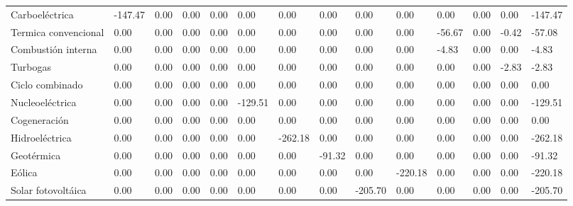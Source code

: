 \documentclass{sener2025}
\begin{document}
\begin{tabladoradoLargo}
\begin{xltabular}{\textwidth}{QZZZZZZZZZZZZZ}
    \hspace{2.7em} Carboeléctrica & -147.47 & 0.00 & 0.00 & 0.00 & 0.00 & 0.00 & 0.00 & 0.00 & 0.00 & 0.00 & 0.00 & 0.00 & -147.47 \\
    \hspace{2.7em} Termica convencional & 0.00 & 0.00 & 0.00 & 0.00 & 0.00 & 0.00 & 0.00 & 0.00 & 0.00 & -56.67 & 0.00 & -0.42 & -57.08 \\
    \hspace{2.7em} Combustión interna & 0.00 & 0.00 & 0.00 & 0.00 & 0.00 & 0.00 & 0.00 & 0.00 & 0.00 & -4.83 & 0.00 & 0.00 & -4.83 \\
    \hspace{2.7em} Turbogas & 0.00 & 0.00 & 0.00 & 0.00 & 0.00 & 0.00 & 0.00 & 0.00 & 0.00 & 0.00 & 0.00 & -2.83 & -2.83 \\
    \hspace{2.7em} Ciclo combinado & 0.00 & 0.00 & 0.00 & 0.00 & 0.00 & 0.00 & 0.00 & 0.00 & 0.00 & 0.00 & 0.00 & 0.00 & 0.00 \\
    \hspace{2.7em} Nucleoeléctrica & 0.00 & 0.00 & 0.00 & 0.00 & -129.51 & 0.00 & 0.00 & 0.00 & 0.00 & 0.00 & 0.00 & 0.00 & -129.51 \\
    \hspace{2.7em} Cogeneración & 0.00 & 0.00 & 0.00 & 0.00 & 0.00 & 0.00 & 0.00 & 0.00 & 0.00 & 0.00 & 0.00 & 0.00 & 0.00 \\
    \hspace{2.7em} Hidroeléctrica & 0.00 & 0.00 & 0.00 & 0.00 & 0.00 & -262.18 & 0.00 & 0.00 & 0.00 & 0.00 & 0.00 & 0.00 & -262.18 \\
    \hspace{2.7em} Geotérmica & 0.00 & 0.00 & 0.00 & 0.00 & 0.00 & 0.00 & -91.32 & 0.00 & 0.00 & 0.00 & 0.00 & 0.00 & -91.32 \\
    \hspace{2.7em} Eólica & 0.00 & 0.00 & 0.00 & 0.00 & 0.00 & 0.00 & 0.00 & 0.00 & -220.18 & 0.00 & 0.00 & 0.00 & -220.18 \\
    \hspace{2.7em} Solar fotovoltáica & 0.00 & 0.00 & 0.00 & 0.00 & 0.00 & 0.00 & 0.00 & -205.70 & 0.00 & 0.00 & 0.00 & 0.00 & -205.70 \\
  \end{xltabular}
\end{tabladoradoLargo}
\vspace{-4pt}
\end{document}
